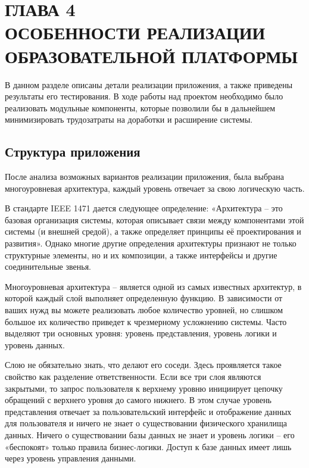 \section*{ГЛАВА 4\\ ОСОБЕННОСТИ РЕАЛИЗАЦИИ ОБРАЗОВАТЕЛЬНОЙ ПЛАТФОРМЫ}
\setcounter{section}{4}\setcounter{subsection}{0}


В данном разделе описаны детали реализации приложения, а также приведены результаты его тестирования.
В ходе работы над проектом необходимо было реализовать модульные компоненты, которые позволили
бы в дальнейшем минимизировать трудозатраты на доработки и расширение системы.

\subsection{Структура приложения}

После анализа возможных вариантов реализации приложения, была выбрана многоуровневая архитектура,
каждый уровень отвечает за свою логическую часть.

В стандарте IEEE 1471 дается следующее определение: «Архитектура – это базовая организация
системы, которая описывает связи между компонентами этой системы (и внешней средой),
а также определяет принципы её проектирования и развития». Однако многие другие определения
архитектуры признают не только структурные элементы, но и их композиции, а также интерфейсы
и другие соединительные звенья.

Многоуровневая архитектура – является одной из самых известных архитектур, в которой
каждый слой выполняет определенную функцию. В зависимости от ваших нужд вы можете
реализовать любое количество уровней, но слишком большое их количество приведет к
чрезмерному усложнению системы. Часто выделяют три основных уровня: уровень представления,
уровень логики и уровень данных.

Слою не обязательно знать, что делают его соседи. Здесь проявляется такое свойство как
разделение ответственности. Если все три слоя являются закрытыми, то запрос пользователя
к верхнему уровню инициирует цепочку обращений с верхнего уровня до самого нижнего.
В этом случае уровень представления отвечает за пользовательский интерфейс и отображение
данных для пользователя и ничего не знает о существовании физического хранилища данных.
Ничего о существовании базы данных не знает и уровень логики – его «беспокоят» только
правила бизнес-логики. Доступ к базе данных имеет лишь через уровень управления данными.

